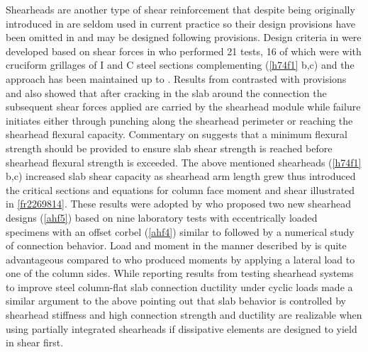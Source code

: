 Shearheads are another type of shear reinforcement that despite being originally introduced in \cite{wheeler1936} are seldom used in current practice so their design provisions have been omitted in \cite{aci31819} and may be designed following \cite{ACI31814} provisions. Design criteria in \cite{aci31871} were developed based on shear forces in \cite{hawkins1974,corley1968} who performed 21 tests, 16 of which were with cruciform grillages of $\mathrm{I}$ and $\mathrm{C}$ steel sections complementing \cite{corley1968,hawkins1974}(\ref{h74f1} b,c) and the approach has been maintained up to \cite{ACI31814}. Results from \cite{hawkins1974a} contrasted with \cite{aci31871} provisions and \cite{hawkins1974} also showed that after cracking in the slab around the connection the subsequent shear forces applied are carried by the shearhead module while failure initiates either through punching along the shearhead perimeter or reaching the shearhead flexural capacity. Commentary on \citet[Section 22.6.9]{ACI31814} suggests that a minimum flexural strength should be provided to ensure slab shear strength is reached before shearhead flexural strength is exceeded. The above mentioned shearheads (\ref{h74f1} b,c) increased slab shear capacity as shearhead arm length grew thus \cite{corley1968,hawkins1974} introduced the critical sections and equations for column face moment and shear illustrated in \ref{fr2269814}. These results were adopted by \cite{Al-hamd2018} who proposed two new shearhead designs (\ref{ahf5}) based on nine laboratory tests with eccentrically loaded specimens with an offset corbel (\ref{ahf4}) similar to \cite{kruger1998} followed by a numerical study of connection behavior. Load and moment in the manner described by \cite{kruger1998,Al-hamd2018} is quite advantageous compared to \cite{ghali2000stud,kang2009nonlinear,moreno2008punching,song2012effective,hawkins1974,islam1976} who produced moments by applying a lateral load to one of the column sides. While reporting results from testing shearhead systems to improve steel column-flat slab connection ductility under cyclic loads \cite{EDER2012239} made a similar argument to the above pointing out that slab behavior is controlled by shearhead stiffness and high connection strength and ductility are realizable when using partially integrated shearheads if dissipative elements are designed to yield in shear first. 
